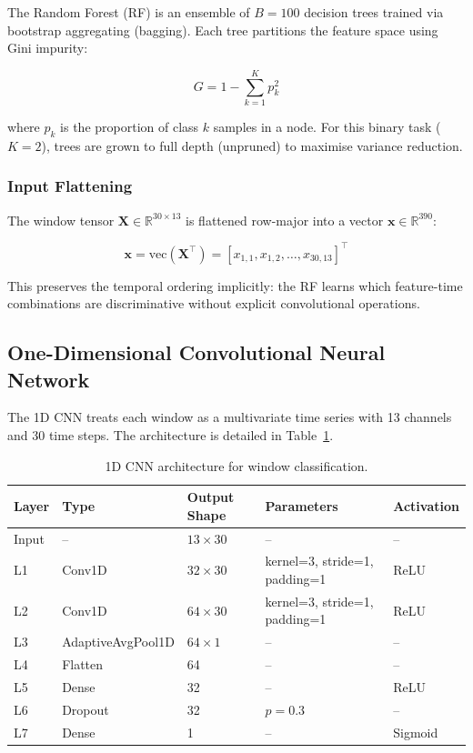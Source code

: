 \documentclass[11pt,a4paper]{article}
\begin{document}
The Random Forest (RF) is an ensemble of $B = 100$ decision trees trained via bootstrap aggregating (bagging). Each tree partitions the feature space using Gini impurity:

\begin{equation}
    G = 1 - \sum_{k=1}^{K} p_k^2
\end{equation}

where $p_k$ is the proportion of class $k$ samples in a node. For this binary task ($K = 2$), trees are grown to full depth (unpruned) to maximise variance reduction.

\subsubsection{Input Flattening}

The window tensor $\mathbf{X} \in \mathbb{R}^{30 \times 13}$ is flattened row-major into a vector $\mathbf{x} \in \mathbb{R}^{390}$:

\begin{equation}
    \mathbf{x} = \text{vec}(\mathbf{X}^\top) = [x_{1,1}, x_{1,2}, \dots, x_{30,13}]^\top
\end{equation}

This preserves the temporal ordering implicitly: the RF learns which feature-time combinations are discriminative without explicit convolutional operations.

\subsection{One-Dimensional Convolutional Neural Network}

The 1D CNN treats each window as a multivariate time series with 13 channels and 30 time steps. The architecture is detailed in Table~\ref{tab:cnn_arch}.

\begin{table}[H]
\centering
\caption{1D CNN architecture for window classification.}
\label{tab:cnn_arch}
\begin{tabular}{@{}lllll@{}}
\toprule
\textbf{Layer} & \textbf{Type} & \textbf{Output Shape} & \textbf{Parameters} & \textbf{Activation} \\
\midrule
Input & -- & $13 \times 30$ & -- & -- \\
L1 & Conv1D & $32 \times 30$ & kernel=3, stride=1, padding=1 & ReLU \\
L2 & Conv1D & $64 \times 30$ & kernel=3, stride=1, padding=1 & ReLU \\
L3 & AdaptiveAvgPool1D & $64 \times 1$ & -- & -- \\
L4 & Flatten & 64 & -- & -- \\
L5 & Dense & 32 & -- & ReLU \\
L6 & Dropout & 32 & $p = 0.3$ & -- \\
L7 & Dense & 1 & -- & Sigmoid \\
\bottomrule
\end{tabular}
\end{table}
\end{document}
